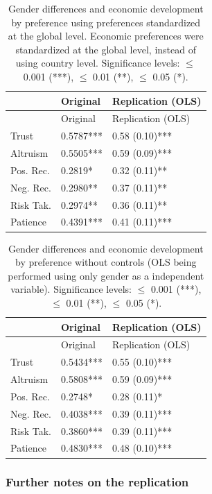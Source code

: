 \documentclass[
]{article}
\begin{document}
\begin{longtable}[]{@{}lll@{}}
\caption{Gender differences and economic development by preference using
preferences standardized at the global level. Economic preferences were
standardized at the global level, instead of using country level.
Significance levels: \(\le\) 0.001 (***), \(\le\) 0.01 (**), \(\le\)
0.05 (*).}\tabularnewline
\toprule()
& Original & Replication (OLS) \\
\midrule()
\endfirsthead
\toprule()
& Original & Replication (OLS) \\
\midrule()
\endhead
Trust & 0.5787*** & 0.58 (0.10)*** \\
Altruism & 0.5505*** & 0.59 (0.09)*** \\
Pos. Rec. & 0.2819* & 0.32 (0.11)** \\
Neg. Rec. & 0.2980** & 0.37 (0.11)** \\
Risk Tak. & 0.2974** & 0.36 (0.11)** \\
Patience & 0.4391*** & 0.41 (0.11)*** \\
\bottomrule()
\end{longtable}

\begin{longtable}[]{@{}lll@{}}
\caption{Gender differences and economic development by preference
without controls (OLS being performed using only gender as a independent
variable). Significance levels: \(\le\) 0.001 (***), \(\le\) 0.01 (**),
\(\le\) 0.05 (*).}\tabularnewline
\toprule()
& Original & Replication (OLS) \\
\midrule()
\endfirsthead
\toprule()
& Original & Replication (OLS) \\
\midrule()
\endhead
Trust & 0.5434*** & 0.55 (0.10)*** \\
Altruism & 0.5808*** & 0.59 (0.09)*** \\
Pos. Rec. & 0.2748* & 0.28 (0.11)* \\
Neg. Rec. & 0.4038*** & 0.39 (0.11)*** \\
Risk Tak. & 0.3860*** & 0.39 (0.11)*** \\
Patience & 0.4830*** & 0.48 (0.10)*** \\
\bottomrule()
\end{longtable}

\hypertarget{further-notes-on-the-replication}{%
\subsubsection{Further notes on the
replication}\label{further-notes-on-the-replication}}
\end{document}
